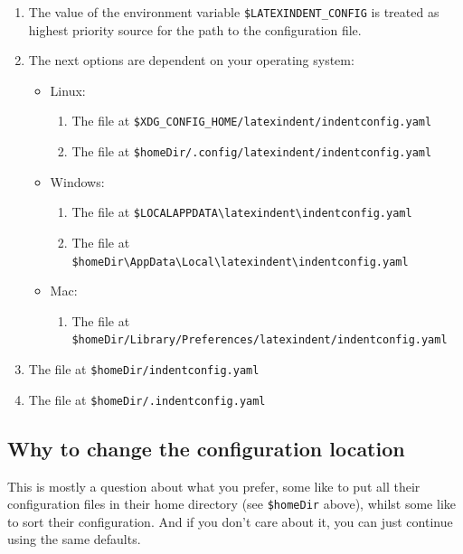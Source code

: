 \documentclass[10pt]{article}
\begin{document}
  \begin{enumerate}
   \item The value of the environment variable \texttt{\$LATEXINDENT\_CONFIG} is treated
         as highest priority source for the path to the configuration file.
   \item The next options are dependent on your operating system:
         \begin{itemize}
          \item Linux:
                \begin{enumerate}
                 \item The file at
                       \texttt{\$XDG\_CONFIG\_HOME/latexindent/indentconfig.yaml}
                 \item The file at
                       \texttt{\$homeDir/.config/latexindent/indentconfig.yaml}
                \end{enumerate}
          \item Windows:
                \begin{enumerate}
                 \item The file at
                       \texttt{\$LOCALAPPDATA\textbackslash{}latexindent\textbackslash{}indentconfig.yaml}
                 \item The file at
                       \texttt{\$homeDir\textbackslash{}AppData\textbackslash{}Local\textbackslash{}latexindent\textbackslash{}indentconfig.yaml}
                \end{enumerate}
          \item Mac:
                \begin{enumerate}
                 \item The file at
                       \texttt{\$homeDir/Library/Preferences/latexindent/indentconfig.yaml}
                \end{enumerate}
         \end{itemize}
   \item The file at \texttt{\$homeDir/indentconfig.yaml}
   \item The file at \texttt{\$homeDir/.indentconfig.yaml}
  \end{enumerate}
 \subsection{Why to change the configuration location}
  This is mostly a question about what you prefer, some like to put all their configuration files in their home directory (see \texttt{\$homeDir} above),
  whilst some like to sort their configuration. And if you don't care about it, you can just continue using the same defaults.
\end{document}
